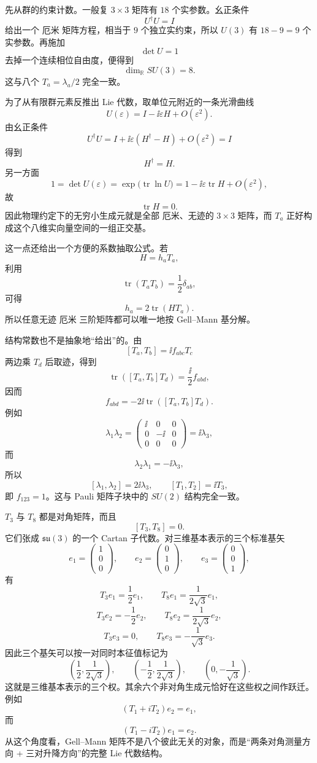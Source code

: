 先从群的约束计数。一般复 $3\times3$ 矩阵有 $18$ 个实参数。幺正条件
\[
U^\dagger U=I
\]
给出一个 厄米 矩阵方程，相当于 $9$ 个独立实约束，所以 $U(3)$ 有 $18-9=9$ 个实参数。再施加
\[
\det U=1
\]
去掉一个连续相位自由度，便得到
\[
\dim_{\mathbb R}SU(3)=8.
\]
这与八个 $T_a=\lambda_a/2$ 完全一致。

为了从有限群元素反推出 Lie 代数，取单位元附近的一条光滑曲线
\[
U(\varepsilon)=I-\ii\varepsilon H+O(\varepsilon^2).
\]
由幺正条件
\[
U^\dagger U
=I+\ii\varepsilon(H^\dagger-H)+O(\varepsilon^2)=I
\]
得到
\[
H^\dagger=H.
\]
另一方面
\[
1=\det U(\varepsilon)
=\exp\!\bigl(\operatorname{tr}\ln U\bigr)
=1-\ii\varepsilon\operatorname{tr}H+O(\varepsilon^2),
\]
故
\[
\operatorname{tr}H=0.
\]
因此物理约定下的无穷小生成元就是全部 厄米、无迹的 $3\times3$ 矩阵，而 $T_a$ 正好构成这个八维实向量空间的一组正交基。

这一点还给出一个方便的系数抽取公式。若
\[
H=h_aT_a,
\]
利用
\[
\operatorname{tr}(T_aT_b)=\frac12\delta_{ab},
\]
可得
\[
\boxed{
h_a=2\operatorname{tr}(HT_a)
}.
\]
所以任意无迹 厄米 三阶矩阵都可以唯一地按 Gell--Mann 基分解。

结构常数也不是抽象地“给出”的。由
\[
[T_a,T_b]=\ii f_{abc}T_c
\]
两边乘 $T_d$ 后取迹，得到
\[
\operatorname{tr}([T_a,T_b]T_d)
=\frac{\ii}{2}f_{abd},
\]
因而
\[
\boxed{
f_{abd}=-2\ii\operatorname{tr}([T_a,T_b]T_d)
}.
\]
例如
\[
\lambda_1\lambda_2
=\begin{pmatrix}\ii&0&0\\0&-\ii&0\\0&0&0\end{pmatrix}
=\ii\lambda_3,
\]
而
\[
\lambda_2\lambda_1=-\ii\lambda_3,
\]
所以
\[
[\lambda_1,\lambda_2]=2\ii\lambda_3,
\qquad
[T_1,T_2]=\ii T_3,
\]
即 $f_{123}=1$。这与 Pauli 矩阵子块中的 $SU(2)$ 结构完全一致。

$T_3$ 与 $T_8$ 都是对角矩阵，而且
\[
[T_3,T_8]=0.
\]
它们张成 $\mathfrak{su}(3)$ 的一个 Cartan 子代数。对三维基本表示的三个标准基矢
\[
e_1=\begin{pmatrix}1\\0\\0\end{pmatrix},\qquad
 e_2=\begin{pmatrix}0\\1\\0\end{pmatrix},\qquad
 e_3=\begin{pmatrix}0\\0\\1\end{pmatrix},
\]
有
\[
T_3e_1=\frac12e_1,
\qquad
T_8e_1=\frac1{2\sqrt3}e_1,
\]
\[
T_3e_2=-\frac12e_2,
\qquad
T_8e_2=\frac1{2\sqrt3}e_2,
\]
\[
T_3e_3=0,
\qquad
T_8e_3=-\frac1{\sqrt3}e_3.
\]
因此三个基矢可以按一对同时本征值标记为
\[
\left(\frac12,\frac1{2\sqrt3}\right),\qquad
\left(-\frac12,\frac1{2\sqrt3}\right),\qquad
\left(0,-\frac1{\sqrt3}\right).
\]
这就是三维基本表示的三个权。其余六个非对角生成元恰好在这些权之间作跃迁。例如
\[
(T_1+iT_2)e_2=e_1,
\]
而
\[
(T_1-iT_2)e_1=e_2.
\]
从这个角度看，Gell--Mann 矩阵不是八个彼此无关的对象，而是“两条对角测量方向 + 三对升降方向”的完整 Lie 代数结构。

